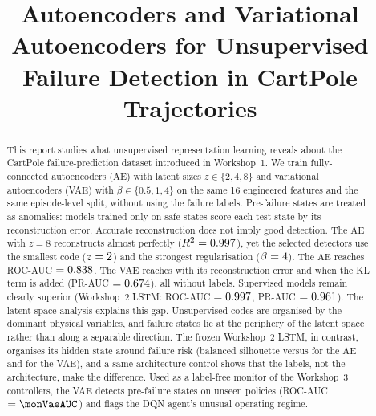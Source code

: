 \documentclass[conference]{IEEEtran}
\begin{document}
\title{Autoencoders and Variational Autoencoders for Unsupervised Failure Detection in CartPole Trajectories}

\author{
\and
{}
\and
{}
}

\maketitle

\begin{abstract}
This report studies what unsupervised representation learning reveals about the CartPole
failure-prediction dataset introduced in Workshop~1. We train fully-connected
autoencoders (AE) with latent sizes $z\in\{2,4,8\}$ and variational autoencoders (VAE)
with $\beta\in\{0.5,1,4\}$ on the same 16 engineered features and the same episode-level
split, without using the failure labels. Pre-failure states are treated as anomalies:
models trained only on safe states score each test state by its reconstruction error.
Accurate reconstruction does not imply good detection. The AE with $z=8$ reconstructs
almost perfectly ($R^2=0.997$), yet the selected detectors use the smallest code
($z=2$) and the strongest regularisation ($\beta=4$). The AE reaches ROC-AUC
$=0.838$. The VAE reaches \vaeAUC{} with its reconstruction error and \vaeklAUC{} when the KL
term is added (PR-AUC $=0.674$), all without labels. Supervised models remain clearly
superior (Workshop~2 LSTM: ROC-AUC $=0.997$, PR-AUC $=0.961$). The latent-space analysis
explains this gap. Unsupervised codes are organised by the dominant physical variables, and
failure states lie at the periphery of the latent space rather than along a separable
direction. The frozen Workshop~2 LSTM, in contrast, organises its hidden state around
failure risk (balanced silhouette \silSup{} versus \silAE{} for the AE and \silVAE{} for
the VAE), and a same-architecture control shows that the labels, not the architecture, make
the difference. Used as a label-free monitor of the Workshop~3 controllers, the VAE detects
pre-failure states on unseen policies (ROC-AUC $=\monVaeAUC$) and flags the DQN agent's
unusual operating regime.
\end{abstract}
\end{document}
